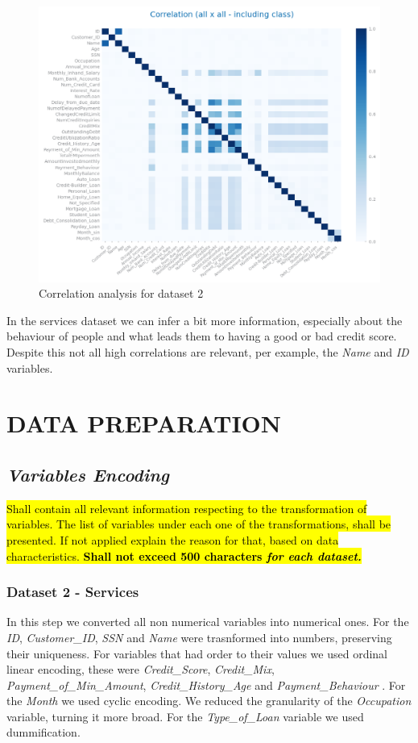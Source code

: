 \documentclass[10pt]{extarticle}
\newcommand{\ctext}[3][RGB]{%
  \begingroup
  \definecolor{hlcolor}{#1}{#2}\sethlcolor{hlcolor}%
  \hl{#3}%
  \endgroup
}
\begin{document}
\begin{figure}[H]
\centering\includegraphics[scale=0.6]{images/dataset2/data_profiling/Credit_Score_correlation_analysis.png}
\caption{Correlation analysis for dataset 2}
\end{figure}
In the services dataset we can infer a bit more information, especially about the behaviour of people and what leads them to having
a good or bad credit score. Despite this not all high correlations are relevant, per example, the \textit{Name} and \textit{ID}
variables.

\section{DATA PREPARATION}

\subsection*{\textit{Variables Encoding}}
\ctext[RGB]{190,190,190}{Shall contain all relevant information respecting to the transformation of variables. The list of variables under each one of the transformations, shall be presented. If not applied explain the reason for that, based on data characteristics.  \textbf{Shall not exceed 500 characters \textit{for each dataset.}}}
\subsubsection*{Dataset 2 - Services}
In this step we converted all non numerical variables into numerical ones. For the \textit{ID}, \textit{Customer\_ID},
\textit{SSN} and \textit{Name} were trasnformed into numbers, preserving their uniqueness. For variables that had order 
to their values we used ordinal linear encoding, these were \textit{Credit\_Score}, \textit{Credit\_Mix}, 
\textit{Payment\_of\_Min\_Amount}, \textit{Credit\_History\_Age} and \textit{Payment\_Behaviour} . For the \textit{Month} we used 
cyclic encoding. We reduced the granularity of the \textit{Occupation} variable, turning it more broad. For the \textit{Type\_of\_Loan}
variable we used dummification. 
\end{document}
